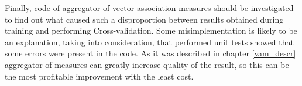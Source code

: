 Finally, code of aggregator of vector association measures should be investigated to find out what caused such a disproportion between results
obtained during training and performing Cross-validation. Some misimplementation is likely to be an explanation, taking into consideration, 
that performed unit tests showed that some errors were present in the code. As it was described in chapter \ref{vam_descr} aggregator of measures 
can greatly increase quality of the result, so this can be the most profitable improvement with the least cost.




